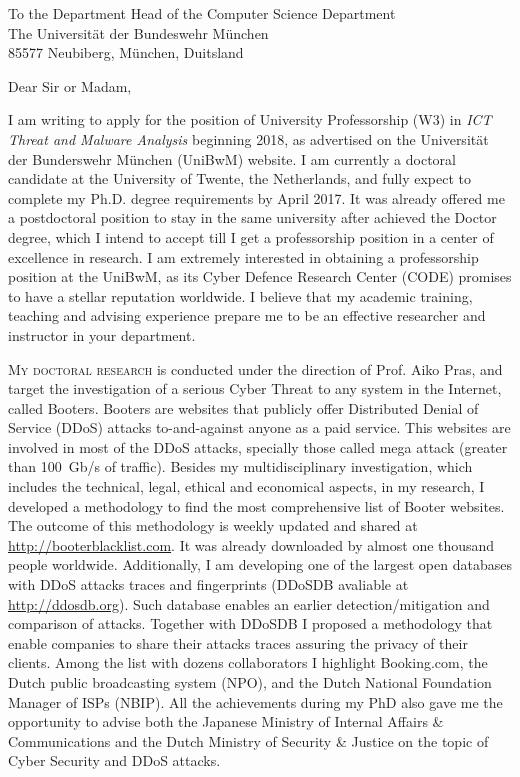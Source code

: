 \documentclass[11pt]{brownletter}
\date{\today}
\begin{document}
\begin{letter}{To the Department Head of the Computer Science Department\\
		The Universit\"at der Bundeswehr M\"unchen\\
		85577 Neubiberg, München, Duitsland
}
\date{\today}

\opening{Dear Sir or Madam,}

I am writing to apply for the position of University Professorship (W3) in \textit{ICT Threat and Malware Analysis} beginning 2018, as advertised on the Universität der Bunderswehr München (UniBwM) website. I am currently a doctoral candidate at the University of Twente, the Netherlands, and fully expect to complete my Ph.D. degree requirements by April 2017. It was already offered me a postdoctoral position to stay in the same university after achieved the Doctor degree, which I intend to accept till I get a professorship position in a center of excellence in research. I am extremely interested in obtaining a professorship position at the UniBwM, as its Cyber Defence Research Center (CODE) promises to have a stellar reputation worldwide. I believe that my academic training, teaching and advising experience prepare me to be an effective researcher and instructor in your department.

\textsc{My doctoral research} is conducted under the direction of Prof. Aiko Pras, and target the investigation of a serious Cyber Threat to any system in the Internet, called Booters. Booters are websites that publicly offer Distributed Denial of Service (DDoS) attacks to-and-against anyone as a paid service. This websites are involved in most of the DDoS attacks, specially those called mega attack (greater than 100~Gb/s of traffic). Besides my multidisciplinary investigation, which includes the technical, legal, ethical and economical aspects, in my research, I developed a methodology to find the most comprehensive list of Booter websites. The outcome of this methodology is weekly updated and shared at \url{http://booterblacklist.com}. It was already downloaded by almost one thousand people worldwide. Additionally, I am developing one of the largest open databases with DDoS attacks traces and fingerprints (DDoSDB avaliable at \url{http://ddosdb.org}). Such database enables an earlier detection/mitigation and comparison of attacks. Together with DDoSDB I proposed a methodology that enable companies to share their attacks traces assuring the privacy of their clients. Among the list with dozens collaborators I highlight Booking.com, the Dutch public broadcasting system (NPO), and the Dutch National Foundation Manager of ISPs (NBIP). All the achievements during my PhD also gave me the opportunity to advise both the Japanese Ministry of Internal Affairs \& Communications and the Dutch Ministry of Security \& Justice on the topic of Cyber Security and DDoS attacks. 


\end{letter}
\end{document}
